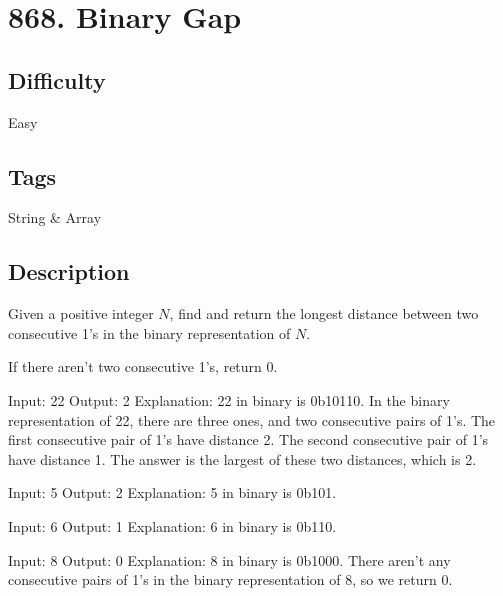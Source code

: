 \tocless\section{868. Binary Gap}
\label{algo:868}

\subsection*{Difficulty}
Easy

\subsection*{Tags}
String \& Array

\subsection*{Description}
Given a positive integer $N$, find and return the longest distance between two consecutive 1's in the binary representation of $N$.

If there aren't two consecutive 1's, return 0.

\begin{example}
\begin{multilinecode}
Input: 22
Output: 2
Explanation:
22 in binary is 0b10110.
In the binary representation of 22, there are three ones, and two consecutive pairs of 1's.
The first consecutive pair of 1's have distance 2.
The second consecutive pair of 1's have distance 1.
The answer is the largest of these two distances, which is 2.
\end{multilinecode}
\end{example}

\begin{example}
\begin{multilinecode}
Input: 5
Output: 2
Explanation:
5 in binary is 0b101.
\end{multilinecode}
\end{example}

\begin{example}
\begin{multilinecode}
Input: 6
Output: 1
Explanation:
6 in binary is 0b110.
\end{multilinecode}
\end{example}

\begin{example}
\begin{multilinecode}
Input: 8
Output: 0
Explanation:
8 in binary is 0b1000.
There aren't any consecutive pairs of 1's in the binary representation of 8, so we return 0.
\end{multilinecode}
\end{example}

